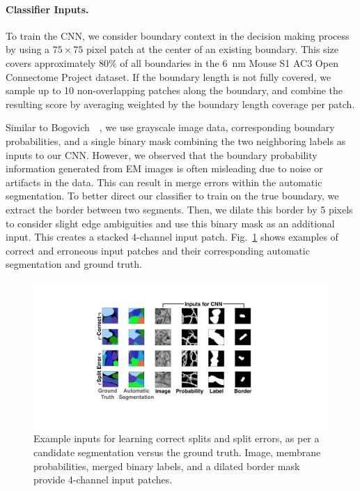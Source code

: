 \paragraph{Classifier Inputs.} To train the CNN, we consider boundary context in the decision making process by using a $75\times75$ pixel patch at the center of an existing boundary. This size covers approximately $80\%$ of all boundaries in the 6~nm Mouse S1 AC3 Open Connectome Project dataset. If the boundary length is not fully covered, we sample up to 10 non-overlapping patches along the boundary, and combine the resulting score by averaging weighted by the boundary length coverage per patch.

Similar to Bogovich~\etal~\cite{BogovicHJ13}, we use grayscale image data,
corresponding boundary probabilities, and a single binary mask combining the two
neighboring labels as inputs to our CNN. However, we observed that the
boundary probability information generated from EM images is often misleading
due to noise or artifacts in the data. This can result in merge errors within
the automatic segmentation. To better direct our classifier to train on the true
boundary, we extract the border between two segments. Then, we dilate this border
by 5 pixels to consider slight edge ambiguities and use this binary mask as an
additional input. This creates a stacked 4-channel input patch.
Fig.~\ref{fig:cnn_inputs} shows examples of correct and erroneous input
patches and their corresponding automatic segmentation and ground truth.

\begin{figure}[t]
\centering  
\includegraphics[width=\linewidth]{gfx/cnn_inputs.pdf}
\caption{Example inputs for learning correct splits and split errors, as per a candidate segmentation versus the ground truth. Image, membrane probabilities, merged binary labels, and a dilated border mask provide 4-channel input patches.}
\label{fig:cnn_inputs}
\end{figure}


